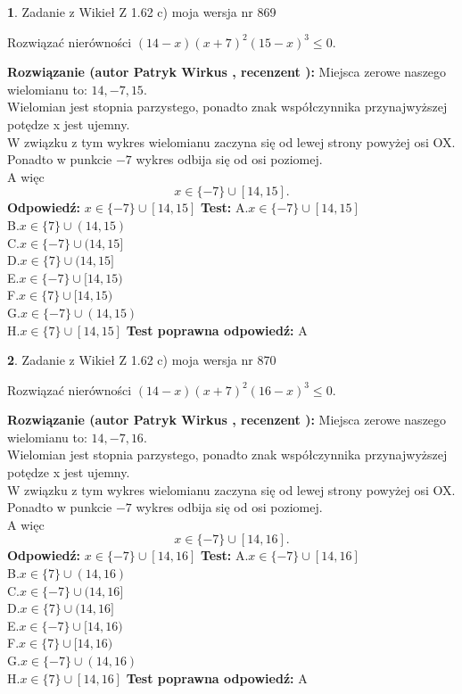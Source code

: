 \documentclass[12pt, a4paper]{article}
\theoremstyle{definition} %
\newtheorem{zad}{}
\newcommand{\zadStart}[1]{\begin{zad}#1\newline}
\newcommand{\zadStop}{\end{zad}}
\newcommand{\rozwStart}[2]{\noindent \textbf{Rozwiązanie (autor #1 , recenzent #2): }\newline}
\newcommand{\rozwStop}{\newline}
\newcommand{\odpStart}{\noindent \textbf{Odpowiedź:}\newline}
\newcommand{\odpStop}{\newline}
\newcommand{\testStart}{\noindent \textbf{Test:}\newline}
\newcommand{\testStop}{\newline}
\newcommand{\kluczStart}{\noindent \textbf{Test poprawna odpowiedź:}\newline}
\newcommand{\kluczStop}{\newline}
\begin{document}
\zadStart{Zadanie z Wikieł Z 1.62 c) moja wersja nr 869}

Rozwiązać nierówności $(14-x)(x+7)^{2}(15-x)^{3}\le0$.
\zadStop
\rozwStart{Patryk Wirkus}{}
Miejsca zerowe naszego wielomianu to: $14, -7, 15$.\\
Wielomian jest stopnia parzystego, ponadto znak współczynnika przy\linebreak najwyższej potędze x jest ujemny.\\ W związku z tym wykres wielomianu zaczyna się od lewej strony powyżej osi OX.\\
Ponadto w punkcie $-7$ wykres odbija się od osi poziomej.\\
A więc $$x \in \{-7\} \cup [14,15].$$
\rozwStop
\odpStart
$x \in \{-7\} \cup [14,15]$
\odpStop
\testStart
A.$x \in \{-7\} \cup [14,15]$\\
B.$x \in \{7\} \cup (14,15)$\\
C.$x \in \{-7\} \cup (14,15]$\\
D.$x \in \{7\} \cup (14,15]$\\
E.$x \in \{-7\} \cup [14,15)$\\
F.$x \in \{7\} \cup [14,15)$\\
G.$x \in \{-7\} \cup (14,15)$\\
H.$x \in \{7\} \cup [14,15]$
\testStop
\kluczStart
A
\kluczStop



\zadStart{Zadanie z Wikieł Z 1.62 c) moja wersja nr 870}

Rozwiązać nierówności $(14-x)(x+7)^{2}(16-x)^{3}\le0$.
\zadStop
\rozwStart{Patryk Wirkus}{}
Miejsca zerowe naszego wielomianu to: $14, -7, 16$.\\
Wielomian jest stopnia parzystego, ponadto znak współczynnika przy\linebreak najwyższej potędze x jest ujemny.\\ W związku z tym wykres wielomianu zaczyna się od lewej strony powyżej osi OX.\\
Ponadto w punkcie $-7$ wykres odbija się od osi poziomej.\\
A więc $$x \in \{-7\} \cup [14,16].$$
\rozwStop
\odpStart
$x \in \{-7\} \cup [14,16]$
\odpStop
\testStart
A.$x \in \{-7\} \cup [14,16]$\\
B.$x \in \{7\} \cup (14,16)$\\
C.$x \in \{-7\} \cup (14,16]$\\
D.$x \in \{7\} \cup (14,16]$\\
E.$x \in \{-7\} \cup [14,16)$\\
F.$x \in \{7\} \cup [14,16)$\\
G.$x \in \{-7\} \cup (14,16)$\\
H.$x \in \{7\} \cup [14,16]$
\testStop
\kluczStart
A
\kluczStop
\end{document}
